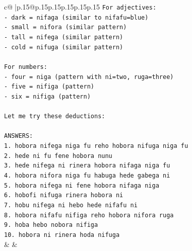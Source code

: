 \documentclass{article}
\begin{document}
{\begin{supertabular}{c@{$\;$}|p{.15\linewidth}@{}p{.15\linewidth}p{.15\linewidth}p{.15\linewidth}p{.15\linewidth}p{.15\linewidth}}
{{{\texttt{For adjectives:} \\
\texttt{{-} dark = nifaga (similar to nifafu=blue)} \\
\texttt{{-} small = nifora (similar pattern)} \\
\texttt{{-} tall = nifega (similar pattern)} \\
\texttt{{-} cold = nifuga (similar pattern)} \\
\\ 
\texttt{For numbers:} \\
\texttt{{-} four = niga (pattern with ni=two, ruga=three)} \\
\texttt{{-} five = nifiga (pattern)} \\
\texttt{{-} six = nifiga (pattern)} \\
\\ 
\texttt{Let me try these deductions:} \\
\\ 
\texttt{ANSWERS:} \\
\texttt{1. hobora nifega niga fu reho hobora nifuga niga fu} \\
\texttt{2. hede ni fu fene hobora nunu} \\
\texttt{3. hede nifega ni rinera hobora nifaga niga fu} \\
\texttt{4. hobora nifora niga fu habuga hede gabega ni} \\
\texttt{5. hobora nifega ni fene hobora nifaga niga} \\
\texttt{6. hobofi nifuga rinera hobora ni} \\
\texttt{7. hobu nifega ni hebo hede nifafu ni} \\
\texttt{8. hobora nifafu nifiga reho hobora nifora ruga} \\
\texttt{9. hoba hebo nobora nifiga} \\
\texttt{10. hobora ni rinera hoda nifuga} \\
            }
        }
    }
    & & \\ \\


\end{supertabular}}
\end{document}
